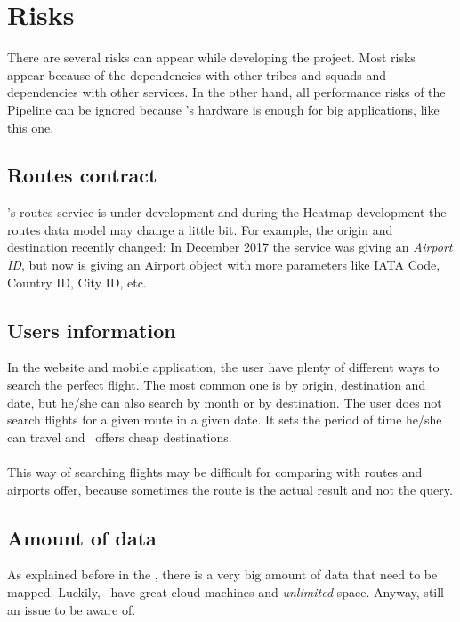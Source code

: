 
\section{Risks}

There are several risks can appear while developing the project. Most risks appear because of the dependencies with other tribes and squads and dependencies with other services. In the other hand, all performance risks of the Pipeline can be ignored because \company's hardware is enough for big applications, like this one.

\subsection{Routes contract}

\squad's routes service is under development and during the Heatmap development the routes data model may change a little bit. For example, the origin and destination recently changed: In December 2017 the service was giving an \textit{Airport ID}, but now is giving an Airport object with more parameters like IATA Code\cite{iata_code}, Country ID, City ID, etc.

\subsection{Users information}

In the website and mobile application, the user have plenty of different ways to search the perfect flight. The most common one is by origin, destination and date, but he/she can also search by month or by destination. The user does not search flights for a given route in a given date. It sets the period of time he/she can travel and \company\ offers cheap destinations.
\\\\
This way of searching flights may be difficult for comparing with routes and airports offer, because sometimes the route is the actual result and not the query.

\subsection{Amount of data}

As explained before in the , there is a very big amount of data that need to be mapped. Luckily, \company\ have great cloud machines and \textit{unlimited} space. Anyway, still an issue to be aware of.

